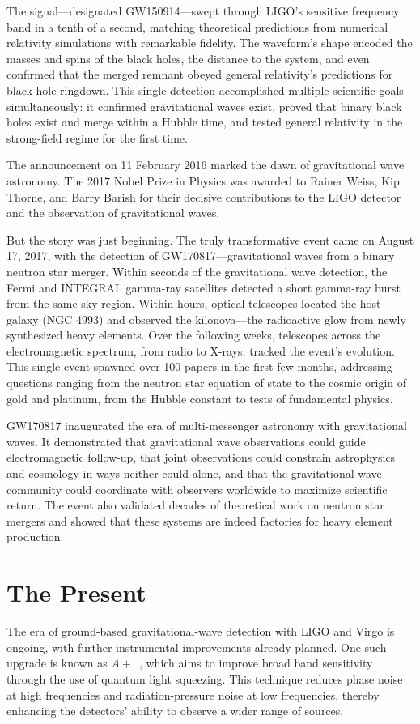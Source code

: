The signal—designated GW150914—swept through LIGO's sensitive frequency band in a tenth of a second, matching theoretical predictions from numerical relativity simulations with remarkable fidelity.
The waveform's shape encoded the masses and spins of the black holes, the distance to the system, and even confirmed that the merged remnant obeyed general relativity's predictions for black hole ringdown.
This single detection accomplished multiple scientific goals simultaneously: it confirmed gravitational waves exist, proved that binary black holes exist and merge within a Hubble time, and tested general relativity in the strong-field regime for the first time.

The announcement on 11 February 2016 marked the dawn of gravitational wave astronomy.
The 2017 Nobel Prize in Physics was awarded to Rainer Weiss, Kip Thorne, and Barry Barish for their decisive contributions to the LIGO detector and the observation of gravitational waves.

But the story was just beginning.
The truly transformative event came on August 17, 2017, with the detection of GW170817—gravitational waves from a binary neutron star merger\cite{collaboration_gw170817_2017}.
Within seconds of the gravitational wave detection, the Fermi and INTEGRAL gamma-ray satellites detected a short gamma-ray burst from the same sky region.
Within hours, optical telescopes located the host galaxy (NGC 4993) and observed the kilonova—the radioactive glow from newly synthesized heavy elements\cite{goldstein_ordinary_2017}.
Over the following weeks, telescopes across the electromagnetic spectrum, from radio to X-rays, tracked the event's evolution.
This single event spawned over 100 papers in the first few months, addressing questions ranging from the neutron star equation of state to the cosmic origin of gold and platinum, from the Hubble constant to tests of fundamental physics.

GW170817 inaugurated the era of multi-messenger astronomy with gravitational waves.
It demonstrated that gravitational wave observations could guide electromagnetic follow-up, that joint observations could constrain astrophysics and cosmology in ways neither could alone, and that the gravitational wave community could coordinate with observers worldwide to maximize scientific return.
The event also validated decades of theoretical work on neutron star mergers and showed that these systems are indeed factories for heavy element production.

\section{The Present}\label{sec:the-present}
The era of ground-based gravitational-wave detection with LIGO and Virgo is ongoing, with further instrumental improvements already planned.
One such upgrade is known as $A+$~\cite{cooper_sensors_2023}, which aims to improve broad band sensitivity through the use of quantum light squeezing.
This technique reduces phase noise at high frequencies and radiation-pressure noise at low frequencies, thereby enhancing the detectors' ability to observe a wider range of sources\cite{miller_new_2019}.

